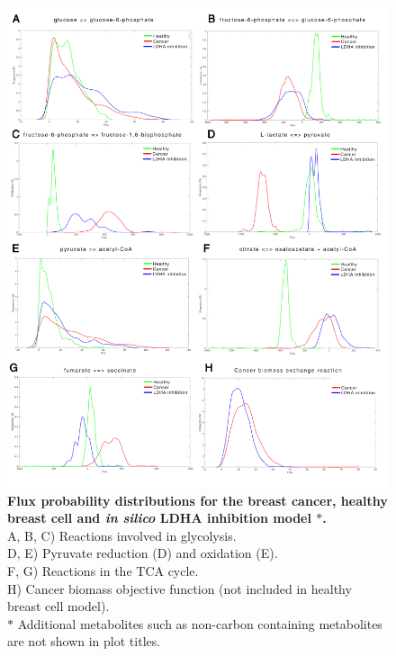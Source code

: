\documentclass[10pt,letterpaper]{article}
\begin{document}
\begin{figure}
\centering
	\includegraphics[scale=0.2]{fig10.png}
	\caption{\textbf{Flux probability distributions for the breast cancer, healthy breast cell and \textit{in silico} LDHA inhibition model $*$.}
	\\A, B, C) Reactions involved in glycolysis.
	\\D, E) Pyruvate reduction (D) and oxidation (E). 
	\\F, G) Reactions in the TCA cycle. 
	\\H) Cancer biomass objective function (not included in healthy breast cell model). 
\\$*$ Additional metabolites such as non-carbon containing metabolites are not shown in plot titles. 
}
\label{figure:10}
\end{figure}
\end{document}
